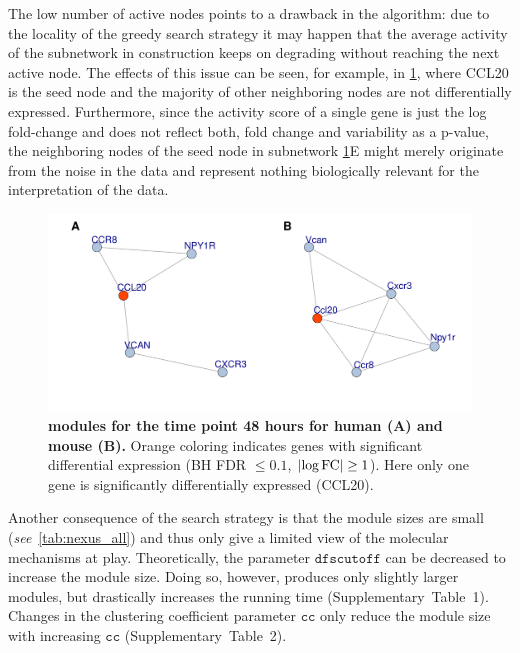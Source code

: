 The low number of active nodes points to a drawback in the \nexus{} algorithm: due to the locality of the greedy search strategy it may happen that the average activity of the subnetwork in construction keeps on degrading without reaching the next active node.
The effects of this issue can be seen, for example, in \cref{fig:nexus}, where CCL20 is the seed node and the majority of other neighboring nodes are not differentially expressed.
Furthermore, since the activity score of a single gene is just the log fold-change and does not reflect both, fold change and variability as a p-value, the neighboring nodes of the seed node in
subnetwork \cref{fig:nexus}E might merely originate from the noise in the data and represent nothing biologically relevant for the interpretation of the data.

\begin{figure}[tbp]
	\centering
	\includegraphics[width=\linewidth]{img/Nexus_module_A.pdf}
	\caption{\textbf{\nexus{} modules for the time point 48 hours for human (A) and mouse (B).}
	Orange coloring indicates genes with significant differential expression (BH FDR $\leq 0.1$, $\lvert\log \mathrm{FC}\rvert \geq 1$).
	Here only one gene is significantly differentially expressed (CCL20).
	}
	\label{fig:nexus}
\end{figure}

Another consequence of the \nexus{} search strategy is that the module sizes are small (\emph{see}~\cref{tab:nexus_all}) and thus only give a limited view of the molecular mechanisms at play.
Theoretically, the parameter $\mathtt{dfscutoff}$ can be decreased to increase the module size.
Doing so, however, produces only slightly larger modules, but drastically increases the running time (Supplementary~Table~1).
Changes in the clustering coefficient parameter $\mathtt{cc}$ only reduce the module size with increasing $\mathtt{cc}$ (Supplementary~Table~2).

